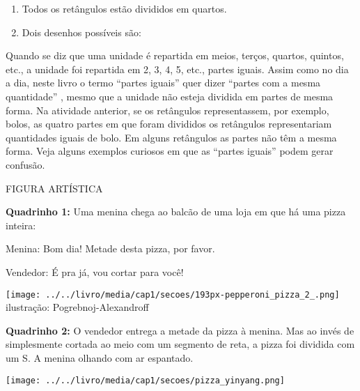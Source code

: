 \documentclass[a4paper,12pt,twoside]{book}
\begin{document}
\begin{resposta*}[breakable]{}{}  
\begin{enumerate} [\quad a)] %
    \item       Todos os retângulos estão divididos em quartos. 
    \item       Dois desenhos possíveis são:
\end{enumerate} %
  
  
  
\end{resposta*}









\begin{refletindo*}[breakable]{}{}  
  Quando se diz que uma unidade é repartida em meios, terços, quartos, quintos, etc., a unidade foi repartida em 2, 3, 4, 5, etc., partes iguais.  
  Assim como no dia a dia, neste livro o termo   ``partes iguais''   quer dizer   ``partes com a mesma quantidade''  , mesmo que a unidade não esteja dividida em partes de mesma forma.  
  Na atividade anterior, se os retângulos representassem, por exemplo, bolos, as quatro partes em que foram divididos os retângulos representariam quantidades iguais de bolo.   
  Em alguns retângulos as partes não têm a mesma forma.  
  Veja alguns exemplos curiosos em que as   ``partes iguais''   podem gerar confusão.  
  
  \begin{imagem*}[breakable]{}{}     FIGURA ARTÍSTICA    
    
    {\bf Quadrinho 1:}     Uma menina chega ao balcão de uma loja em que há uma pizza inteira:     
    
    Menina: Bom dia! Metade desta pizza, por favor.     
    
    Vendedor: É pra já, vou cortar para você!    
    
        \texttt{[image: ../../livro/media/cap1/secoes/193px-pepperoni\_pizza\_2\_.png]}    
    ilustração: Pogrebnoj-Alexandroff    
    
    {\bf Quadrinho 2:}     O vendedor entrega a metade da pizza à menina. Mas ao invés de simplesmente cortada ao meio com um segmento de reta, a pizza foi dividida com um S. A menina olhando com ar espantado.     
    
        \texttt{[image: ../../livro/media/cap1/secoes/pizza\_yinyang.png]}    
  \end{imagem*}  
  

\end{refletindo*}
\end{document}
